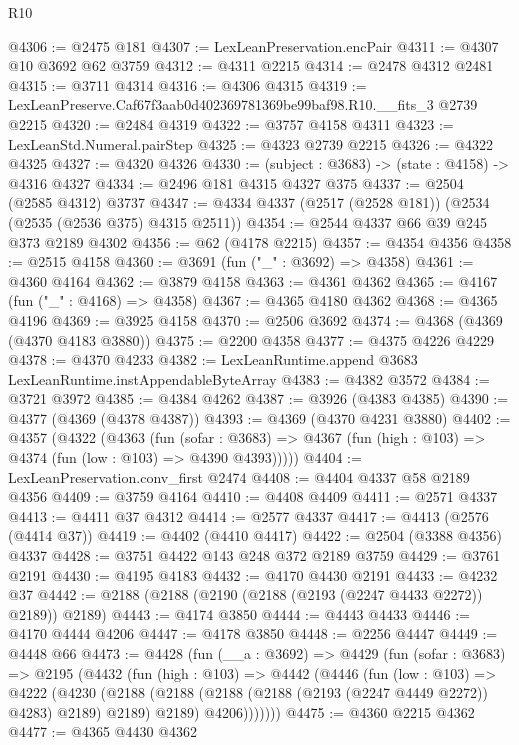 \begin{lexlean}{R10}
\begin{coremodule}
@4306 := @2475 @181
@4307 := LexLeanPreservation.encPair
@4311 := @4307 @10 @3692 @62 @3759
@4312 := @4311 @2215
@4314 := @2478 @4312 @2481
@4315 := @3711 @4314
@4316 := @4306 @4315
@4319 := LexLeanPreserve.Caf67f3aab0d402369781369be99baf98.R10.__fits_3 @2739 @2215
@4320 := @2484 @4319
@4322 := @3757 @4158 @4311
@4323 := LexLeanStd.Numeral.pairStep
@4325 := @4323 @2739 @2215
@4326 := @4322 @4325
@4327 := @4320 @4326
@4330 := (subject : @3683) -> (state : @4158) -> @4316 @4327
@4334 := @2496 @181 @4315 @4327 @375
@4337 := @2504 (@2585 @4312) @3737
@4347 := @4334 @4337 (@2517 (@2528 @181)) (@2534 (@2535 (@2536 @375) @4315 @2511))
@4354 := @2544 @4337 @66 @39 @245 @373 @2189 @4302
@4356 := @62 (@4178 @2215)
@4357 := @4354 @4356
@4358 := @2515 @4158
@4360 := @3691 (fun ("_" : @3692) => @4358)
@4361 := @4360 @4164
@4362 := @3879 @4158
@4363 := @4361 @4362
@4365 := @4167 (fun ("_" : @4168) => @4358)
@4367 := @4365 @4180 @4362
@4368 := @4365 @4196
@4369 := @3925 @4158
@4370 := @2506 @3692
@4374 := @4368 (@4369 (@4370 @4183 @3880))
@4375 := @2200 @4358
@4377 := @4375 @4226 @4229
@4378 := @4370 @4233
@4382 := LexLeanRuntime.append @3683 LexLeanRuntime.instAppendableByteArray
@4383 := @4382 @3572
@4384 := @3721 @3972
@4385 := @4384 @4262
@4387 := @3926 (@4383 @4385)
@4390 := @4377 (@4369 (@4378 @4387))
@4393 := @4369 (@4370 @4231 @3880)
@4402 := @4357
    (@4322
      (@4363
        (fun (sofar : @3683) =>
        @4367 (fun (high : @103) => @4374 (fun (low : @103) => @4390 @4393)))))
@4404 := LexLeanPreservation.conv_first @2474
@4408 := @4404 @4337 @58 @2189 @4356
@4409 := @3759 @4164
@4410 := @4408 @4409
@4411 := @2571 @4337
@4413 := @4411 @37 @4312
@4414 := @2577 @4337
@4417 := @4413 (@2576 (@4414 @37))
@4419 := @4402 (@4410 @4417)
@4422 := @2504 (@3388 @4356) @4337
@4428 := @3751 @4422 @143 @248 @372 @2189 @3759
@4429 := @3761 @2191
@4430 := @4195 @4183
@4432 := @4170 @4430 @2191
@4433 := @4232 @37
@4442 := @2188 (@2188 (@2190 (@2188 (@2193 (@2247 @4433 @2272)) @2189)) @2189)
@4443 := @4174 @3850
@4444 := @4443 @4433
@4446 := @4170 @4444 @4206
@4447 := @4178 @3850
@4448 := @2256 @4447
@4449 := @4448 @66
@4473 := @4428
    (fun (__a : @3692) =>
    @4429
      (fun (sofar : @3683) =>
      @2195
        (@4432
          (fun (high : @103) =>
          @4442
            (@4446
              (fun (low : @103) =>
              @4222
                (@4230
                  (@2188
                    (@2188 (@2188 (@2188 (@2193 (@2247 @4449 @2272)) @4283) @2189) @2189)
                    @2189)
                  @4206)))))))
@4475 := @4360 @2215 @4362
@4477 := @4365 @4430 @4362

\end{coremodule}
\end{lexlean}

